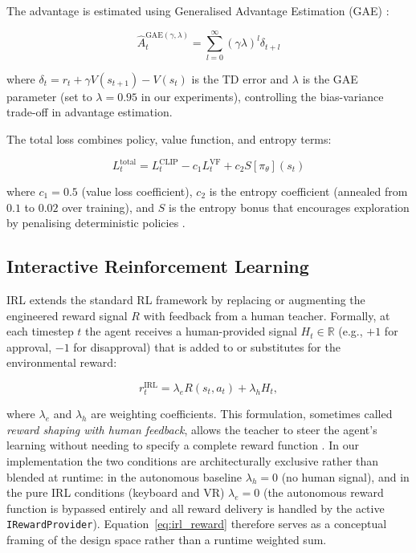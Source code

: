 \documentclass[../report.tex]{subfiles}
\begin{document}
    The advantage is estimated using Generalised Advantage Estimation (GAE) \cite{Schulman2015}:

    \begin{equation}
        \hat{A}_t^{\text{GAE}(\gamma,\lambda)} = \sum_{l=0}^{\infty} (\gamma\lambda)^l \delta_{t+l}
        \label{eq:gae}
    \end{equation}

    where $\delta_t = r_t + \gamma V(s_{t+1}) - V(s_t)$ is the TD error and $\lambda$ is the GAE parameter (set to $\lambda = 0.95$ in our experiments), controlling the bias-variance trade-off in advantage estimation.

    The total loss combines policy, value function, and entropy terms:

    \begin{equation}
        L_t^{\text{total}} = L_t^{\text{CLIP}} - c_1 L_t^{\text{VF}} + c_2 S[\pi_\theta](s_t)
        \label{eq:loss}
    \end{equation}

    where $c_1 = 0.5$ (value loss coefficient), $c_2$ is the entropy coefficient (annealed from $0.1$ to $0.02$ over training), and $S$ is the entropy bonus that encourages exploration by penalising deterministic policies \cite{Williams1991}.

    \subsection{Interactive Reinforcement Learning}

    IRL extends the standard RL framework by replacing or augmenting the engineered reward signal $R$ with feedback from a human teacher. Formally, at each timestep $t$ the agent receives a human-provided signal $H_t \in \mathbb{R}$ (e.g., $+1$ for approval, $-1$ for disapproval) that is added to or substitutes for the environmental reward:

    \begin{equation}
        r_t^{\text{IRL}} = \lambda_e R(s_t, a_t) + \lambda_h H_t,
        \label{eq:irl_reward}
    \end{equation}

    where $\lambda_e$ and $\lambda_h$ are weighting coefficients. This formulation, sometimes called \emph{reward shaping with human feedback}, allows the teacher to steer the agent's learning without needing to specify a complete reward function \cite{Faulkner2020}. In our implementation the two conditions are architecturally exclusive rather than blended at runtime: in the autonomous baseline $\lambda_h = 0$ (no human signal), and in the pure IRL conditions (keyboard and VR) $\lambda_e = 0$ (the autonomous reward function is bypassed entirely and all reward delivery is handled by the active \texttt{IRewardProvider}). Equation~\ref{eq:irl_reward} therefore serves as a conceptual framing of the design space rather than a runtime weighted sum.
\end{document}
